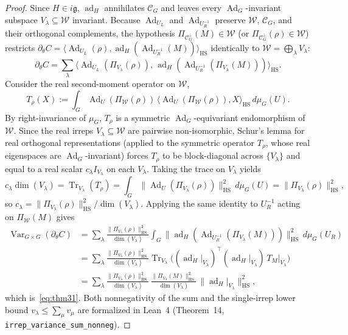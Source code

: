 \documentclass[11pt,a4paper]{article}
\theoremstyle{definition}
\theoremstyle{remark}
\newcommand{\Tr}{\operatorname{Tr}}
\newcommand{\Var}{\operatorname{Var}}
\newcommand{\Ad}{\operatorname{Ad}}
\newcommand{\ad}{\operatorname{ad}}
\newcommand{\HS}{\mathrm{HS}}
\newcommand{\lieg}{\mathfrak{g}}
\begin{document}
\begin{proof}
Since $H \in i\lieg$, $\ad_H$ annihilates $\mathcal{C}_G$ and leaves every $\Ad_G$-invariant subspace $V_\lambda \subseteq \mathcal{W}$ invariant. Because $\Ad_{U_L}$ and $\Ad_{U_R^{-1}}$ preserve $\mathcal{W}$, $\mathcal{C}_G$, and their orthogonal complements, the hypothesis $\Pi_{\mathcal{C}_G^\perp}(M) \in \mathcal{W}$ (or $\Pi_{\mathcal{C}_G^\perp}(\rho) \in \mathcal{W}$) restricts $\partial_\theta C = \langle \Ad_{U_L}(\rho), \ad_H(\Ad_{U_R^{-1}}(M))\rangle_{\HS}$ identically to $\mathcal{W} = \bigoplus_\lambda V_\lambda$:
\[
  \partial_\theta C = \sum_{\lambda} \langle \Ad_{U_L}(\Pi_{V_\lambda}(\rho)),\, \ad_H(\Ad_{U_R^{-1}}(\Pi_{V_\lambda}(M)))\rangle_{\HS}.
\]
Consider the real second-moment operator on $\mathcal{W}$,
\[
  T_\rho(X) := \int_G \Ad_U(\Pi_{\mathcal{W}}(\rho))\,\langle \Ad_U(\Pi_{\mathcal{W}}(\rho)), X\rangle_{\HS}\,d\mu_G(U).
\]
By right-invariance of $\mu_G$, $T_\rho$ is a symmetric $\Ad_G$-equivariant endomorphism of $\mathcal{W}$. Since the real irreps $V_\lambda \subseteq \mathcal{W}$ are pairwise non-isomorphic, Schur's lemma for real orthogonal representations (applied to the symmetric operator $T_\rho$, whose real eigenspaces are $\Ad_G$-invariant) forces $T_\rho$ to be block-diagonal across $\{V_\lambda\}$ and equal to a real scalar $c_\lambda I_{V_\lambda}$ on each $V_\lambda$. Taking the trace on $V_\lambda$ yields
\[
  c_\lambda \dim(V_\lambda) = \Tr_{V_\lambda}(T_\rho) = \int_G \|\Ad_U(\Pi_{V_\lambda}(\rho))\|_{\HS}^2\,d\mu_G(U) = \|\Pi_{V_\lambda}(\rho)\|_{\HS}^2,
\]
so $c_\lambda = \|\Pi_{V_\lambda}(\rho)\|_{\HS}^2 / \dim(V_\lambda)$. Applying the same identity to $U_R^{-1}$ acting on $\Pi_{\mathcal{W}}(M)$ gives
\begin{align*}
  \Var_{G\times G}(\partial_\theta C)
  &= \sum_{\lambda} \frac{\|\Pi_{V_\lambda}(\rho)\|_{\HS}^2}{\dim(V_\lambda)}
     \int_G \|\ad_H(\Ad_{U_R^{-1}}(\Pi_{V_\lambda}(M)))\|_{\HS}^2\,d\mu_G(U_R) \\
  &= \sum_{\lambda} \frac{\|\Pi_{V_\lambda}(\rho)\|_{\HS}^2}{\dim(V_\lambda)}
     \Tr_{V_\lambda}\!\bigl((\ad_H|_{V_\lambda})^\top (\ad_H|_{V_\lambda})\, T_{M}\big|_{V_\lambda}\bigr) \\
  &= \sum_{\lambda} \frac{\|\Pi_{V_\lambda}(\rho)\|_{\HS}^2}{\dim(V_\lambda)}\,
     \frac{\|\Pi_{V_\lambda}(M)\|_{\HS}^2}{\dim(V_\lambda)}\,
     \|\ad_H|_{V_\lambda}\|_{\HS}^2,
\end{align*}
which is~\eqref{eq:thm31}. Both nonnegativity of the sum and the single-irrep lower bound $v_\lambda \le \sum_\mu v_\mu$ are formalized in Lean~4 (Theorem~14, \texttt{irrep\_variance\_sum\_nonneg}).
\end{proof}
\end{document}
